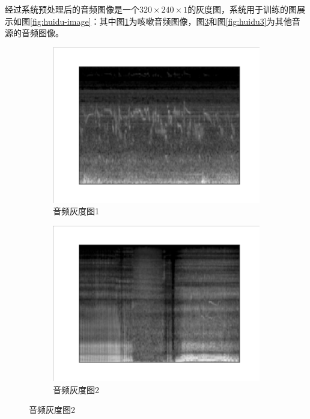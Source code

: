 经过系统预处理后的音频图像是一个\(320\times 240 \times 1\)的灰度图，系统用于训练的图展示如图\ref{fig:huidu-image}：其中图\ref{fig:huidu1}为咳嗽音频图像，图\ref{fig:huidu2}和图\ref{fig:huidu3}为其他音源的音频图像。
    \begin{figure}[h]
      \centering
      \begin{subfigure}{0.3\textwidth}
        \includegraphics[width=\linewidth]{figures/音频处理1.png}
        \caption{音频灰度图1}
        \label{fig:huidu1}
      \end{subfigure}
      \begin{subfigure}{0.3\textwidth}
        \includegraphics[width=\linewidth]{figures/音频处理2.png}
        \caption{音频灰度图2}
        \label{fig:huidu2}

\end{subfigure}
\end{figure}
